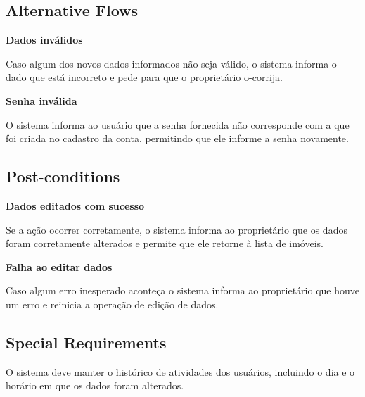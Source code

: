 \subsection*{Alternative Flows}

\textbf{Dados inválidos}

Caso algum dos novos dados informados não seja válido, o sistema informa o dado que está
incorreto e pede para que o proprietário o-corrija.

\textbf{Senha inválida}

O sistema informa ao usuário que a senha fornecida não corresponde com a que foi criada no
cadastro da conta, permitindo que ele informe a senha novamente.

\subsection*{Post-conditions}

\textbf{Dados editados com sucesso}

Se a ação ocorrer corretamente, o sistema informa ao proprietário que os dados foram
corretamente alterados e permite que ele retorne à lista de imóveis.

\textbf{Falha ao editar dados}

Caso algum erro inesperado aconteça o sistema informa ao proprietário que houve um erro e
reinicia a operação de edição de dados.

\subsection*{Special Requirements} 
O sistema deve manter o histórico de atividades dos usuários, incluindo o dia e o horário em que
os dados foram alterados.